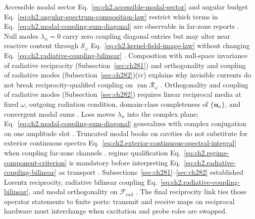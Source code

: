 Accessible modal sector Eq.~\eqref{eq:ch2.accessible-modal-sector} and angular budget
Eq.~\eqref{eq:ch2.angular-spectrum-composition-law} restrict which terms in
Eq.~\eqref{eq:ch2.modal-coupling-sum-diagonal} are observable in far-zone reports
\cite{stratton1941}. Null modes \(\lambda_n=0\) carry zero coupling diagonal
entries but may alter near reactive content through \(\mathcal{S}_\omega\)
Eq.~\eqref{eq:ch2.kernel-field-image-law} without changing
Eq.~\eqref{eq:ch2.radiative-coupling-bilinear} \cite{stratton1941}. Composition with
null-space invariance of radiative reciprocity (Subsection~\ref{sec:ch281}) and
orthogonality and coupling of radiative modes (Subsection~\ref{sec:ch282})(iv) explains why invisible
currents do not break reciprocity-qualified coupling on \(\operatorname{ran}\mathcal{R}_\omega\)
\cite{harrington2001}.
Orthogonality and coupling of radiative modes (Subsection~\ref{sec:ch282}) requires linear reciprocal media
at fixed \(\omega\), outgoing radiation condition, domain-class completeness of
\(\{\mathbf{u}_n\}\), and convergent modal sums \cite{stratton1941}. Loss
moves \(\lambda_n\) into the complex plane; Eq.~\eqref{eq:ch2.modal-coupling-sum-diagonal}
generalizes with complex conjugation on one amplitude slot \cite{stratton1941}. Truncated
modal books on cavities do not substitute for exterior continuous spectra
Eq.~\eqref{eq:ch2.exterior-continuous-spectral-integral} when coupling far-zone channels
\cite{jackson1999}. regime qualification Eq.~\eqref{eq:ch2.regime-component-criterion} is
mandatory before interpreting Eq.~\eqref{eq:ch2.radiative-coupling-bilinear} as transport
\cite{stratton1941}.
Subsections~\ref{sec:ch281}--\ref{sec:ch282} established Lorentz reciprocity, radiative bilinear
coupling Eq.~\eqref{eq:ch2.radiative-coupling-bilinear}, and modal orthogonality on
\(\mathcal{F}_{\mathrm{rad}}\) \cite{stratton1941}. The final reciprocity link ties those
operator statements to finite ports: transmit and receive maps on reciprocal hardware must
interchange when excitation and probe roles are swapped.
